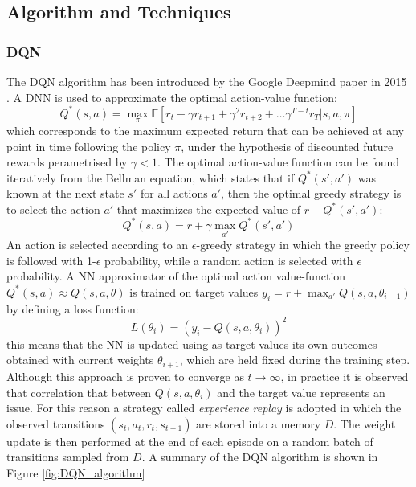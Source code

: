 \documentclass[a4paper, 11pt]{article}
\begin{document}
\subsection{Algorithm and Techniques}
\subsubsection{DQN}
The DQN algorithm has been introduced by the Google Deepmind paper in 2015 \cite{Mnih2015}. A DNN is used to approximate the optimal action-value function:
\begin{equation}
Q^*(s,a) = \max_{\pi}\mathbb{E}\left[ r_t +\gamma r_{t+1} +\gamma^2 r_{t+2} + \dots \gamma^{T-t}r_T | s, a, \pi\right]
\end{equation}
which corresponds to the maximum expected return that can be achieved at any point in time following the policy $\pi$, under the hypothesis of discounted future rewards perametrised by $\gamma <1$. The optimal action-value function can be found iteratively from the Bellman equation, which states that if $Q^*(s',a')$ was known at the next state $s'$ for all actions $a'$, then the optimal greedy strategy is to select the action $a'$ that maximizes the expected value of $r+Q^*(s',a')$: 
\begin{equation}\label{eq:BellmanEq}
Q^*(s,a) = r +\gamma \max_{a'}Q^*(s',a')
\end{equation}
An action is selected according to an $\epsilon$-greedy strategy in which the greedy policy is followed with 1-$\epsilon$ probability, while a random action is selected with $\epsilon$ probability. 
A NN approximator of the optimal action value-function $Q^*(s,a) \approx Q(s,a,\theta)$ is trained on target values $y_i=r+\max_{a'} Q(s,a,\theta_{i-1})$ by defining a loss function:
\begin{equation}\label{eq:DQN-loss}
L(\theta_i) = \left( y_i - Q(s,a,\theta_{i}) \right)^2
\end{equation}
this means that the NN is updated using as target values its own outcomes obtained with current weights $\theta_{i+1}$, which are held fixed during the training step. Although this approach is proven to converge as $t\to\infty$, in practice it is observed that correlation that between $Q(s,a,\theta_{i})$ and the target value represents an issue. For this reason a strategy called \emph{experience replay} is adopted in which the observed transitions $(s_t, a_t, r_t, s_{t+1})$ are stored into a memory $D$. The weight update is then performed at the end of each episode on a random batch of transitions sampled from $D$. A summary of the DQN algorithm is shown in Figure \ref{fig:DQN_algorithm}  
\end{document}

